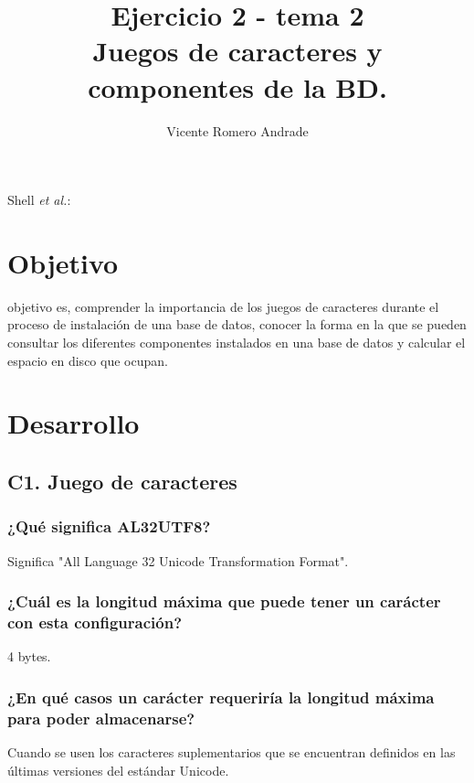\documentclass[journal]{IEEEtran}
\begin{document}
\title{Ejercicio 2 - tema 2 \\ Juegos de caracteres y componentes de la BD.}
%
\author{Vicente Romero Andrade}

%
{Shell \MakeLowercase{\textit{et al.}}: }

\maketitle


\IEEEpeerreviewmaketitle

\section{Objetivo}

 objetivo es, comprender la importancia de los juegos de caracteres durante el proceso de instalación de una base de datos, conocer la forma en la que se 
pueden consultar los diferentes componentes instalados en una base de datos y calcular el espacio en disco que ocupan.


\section{Desarrollo}
\subsection{C1. Juego de caracteres}
\subsubsection{¿Qué significa AL32UTF8?}
Significa "All Language 32 Unicode Transformation Format".
\subsubsection{¿Cuál es la longitud máxima que puede tener un carácter con esta configuración?}
4 bytes.
\subsubsection{¿En qué casos un carácter requeriría la longitud máxima para poder almacenarse?}
Cuando se usen los caracteres suplementarios que se encuentran definidos en las últimas versiones
del estándar Unicode.
\end{document}
